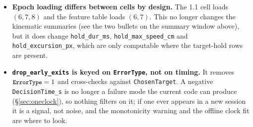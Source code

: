 \documentclass[11pt,a4paper]{article}
\newcommand{\code}[1]{\texttt{\small #1}}
\begin{document}
\begin{itemize}[leftmargin=*,itemsep=5pt]
\item \textbf{Epoch loading differs between cells by design.} The 1.1 cell loads
$(6,7,8)$ and the feature table loads $(6,7)$. This no longer changes the
kinematic summaries (see the two bullets on the summary window above), but it does change
\code{hold\_dur\_ms}, \code{hold\_max\_speed\_cm} and \code{hold\_excursion\_px},
which are only computable where the target-hold rows are present.

\item \textbf{\code{drop\_early\_exits} is keyed on \code{ErrorType}, not on
timing.} It removes $\code{ErrorType} = 1$ and cross-checks against
\code{ChosenTarget}. A negative \code{DecisionTime\_s} is no longer a failure
mode the current code can produce (\S\ref{sec:oneclock}), so nothing filters on
it; if one ever appears in a new session it is a signal, not noise, and the
monotonicity warning and the offline clock fit are where to look.

\end{itemize}
\end{document}
